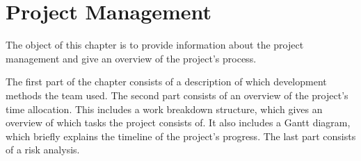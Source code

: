 \chapter{Project Management}

The object of this chapter is to provide information about the project management and give an overview of the project's process. 

The first part of the chapter consists of a description of which development methods the team used. The second part consists of an overview of the project's time allocation. This includes a work breakdown structure, which gives an overview of which tasks the project consists of. It also includes a Gantt diagram, which briefly explains the timeline of the project's progress. The last part consists of a risk analysis.







